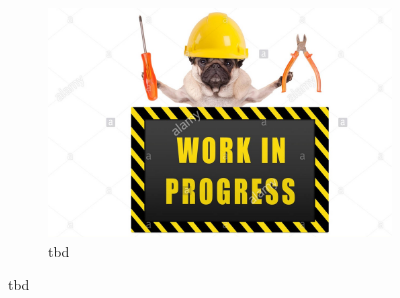 \begin{figure} [b]
\begin{subfigure}[t]{0.3\textwidth}
		\includegraphics[width=\textwidth]{figures/placeholder.png}
		\caption{
			tbd
		}
	\end{subfigure}
	\caption[tbd]{
		tbd
	} \label{fig:ch5:segmentation_examples}
\end{figure}






